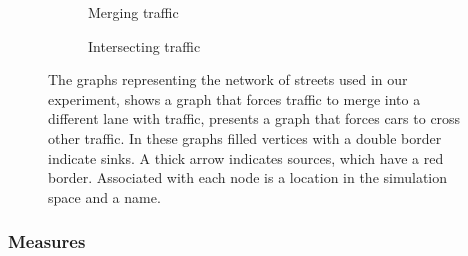 \begin{figure}
	\centering
	\begin{subfigure}{0.49\textwidth}
		\centering
		
		\caption{Merging traffic}
		\label{fig:method:experiment:merging}
	\end{subfigure}
	\begin{subfigure}{0.49\textwidth}
		\centering
		
		\caption{Intersecting traffic}
		\label{fig:method:experiment:intersection}
	\end{subfigure}	
	\caption{The graphs representing the network of streets used in our experiment,  shows a graph that forces traffic to merge into a different lane with traffic,  presents a graph that forces cars to cross other traffic. In these graphs filled vertices with a double border indicate sinks. A thick arrow indicates sources, which have a red border. Associated with each node is a location in the simulation space and a name.}
	\label{fig:method:experimentGraphs}
\end{figure}

\subsubsection{Measures}
\label{ss:method:experiment:measures}








